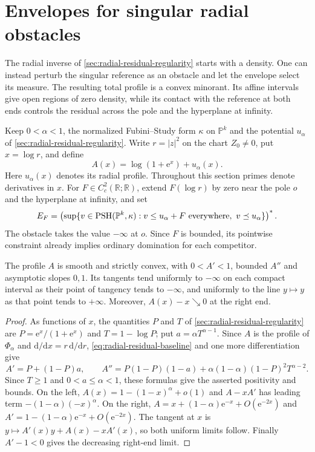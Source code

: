 \section{Envelopes for singular radial obstacles}
\label{sec:singular-radial-obstacles}

The radial inverse of \cref{sec:radial-residual-regularity} starts with a density. One can instead perturb the singular reference as an obstacle and let the envelope select its measure. The resulting total profile is a convex minorant. Its affine intervals give open regions of zero density, while its contact with the reference at both ends controls the residual across the pole and the hyperplane at infinity.

Keep $0<\alpha<1$, the normalized Fubini--Study form $\kappa$ on $\mathbb P^k$ and the potential $u_\alpha$ of \cref{sec:radial-residual-regularity}. Write $r=|z|^2$ on the chart $Z_0\ne0$, put $x=\log r$, and define
\[
 A(x)=\log(1+\mathrm e^x)+u_\alpha(x).
\]
Here $u_\alpha(x)$ denotes its radial profile. Throughout this section primes denote derivatives in $x$. For $F\in C_c^2(\mathbb R;\mathbb R)$, extend $F(\log r)$ by zero near the pole $o$ and the hyperplane at infinity, and set
\begin{equation}\label{eq:singular-radial-envelope}
 E_F=\left(\sup\{v\in\mathrm{PSH}(\mathbb P^k,\kappa):
       v\leq u_\alpha+F\ \text{everywhere},\ v\preceq u_\alpha\}\right)^*.
\end{equation}
The obstacle takes the value $-\infty$ at $o$. Since $F$ is bounded, its pointwise constraint already implies ordinary domination for each competitor.

\begin{lemma}\label{lem:singular-radial-profile}
The profile $A$ is smooth and strictly convex, with $0<A'<1$, bounded $A''$ and asymptotic slopes $0,1$. Its tangents tend uniformly to $-\infty$ on each compact interval as their point of tangency tends to $-\infty$, and uniformly to the line $y\mapsto y$ as that point tends to $+\infty$. Moreover, $A(x)-x\searrow0$ at the right end.
\end{lemma}
\begin{proof}
As functions of $x$, the quantities $P$ and $T$ of \cref{sec:radial-residual-regularity} are $P=\mathrm e^x/(1+\mathrm e^x)$ and $T=1-\log P$; put $a=\alpha T^{\alpha-1}$. Since $A$ is the profile of $\Phi_\alpha$ and $\mathrm d/\mathrm dx=r\,\mathrm d/\mathrm dr$, \eqref{eq:radial-residual-baseline} and one more differentiation give
\[
 A'=P+(1-P)a,\qquad
 A''=P(1-P)(1-a)+\alpha(1-\alpha)(1-P)^2T^{\alpha-2}.
\]
Since $T\geq1$ and $0<a\leq\alpha<1$, these formulas give the asserted positivity and bounds. On the left, $A(x)=1-(1-x)^\alpha+o(1)$ and $A-xA'$ has leading term $-(1-\alpha)(-x)^\alpha$. On the right,
$A=x+(1-\alpha)\mathrm e^{-x}+O(\mathrm e^{-2x})$ and
$A'=1-(1-\alpha)\mathrm e^{-x}+O(\mathrm e^{-2x})$.
The tangent at $x$ is $y\mapsto A'(x)y+A(x)-xA'(x)$, so both uniform limits follow. Finally $A'-1<0$ gives the decreasing right-end limit.
\end{proof}


